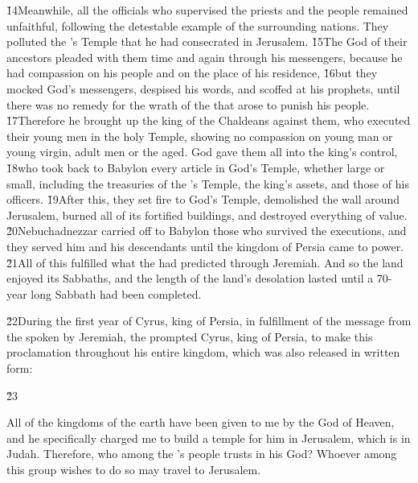 \v{14}Meanwhile, all the officials who supervised the priests and the people remained unfaithful, following the detestable example of the surrounding nations. They polluted the 's Temple that he had consecrated in Jerusalem. \v{15}The  God of their ancestors pleaded with them time and again through his messengers, because he had compassion on his people and on the place of his residence, \v{16}but they mocked God's messengers, despised his words, and scoffed at his prophets, until there was no remedy for the wrath of the  that arose to punish his people. \v{17}Therefore he brought up the king of the Chaldeans against them, who executed their young men in the holy Temple, showing no compassion on young man or young virgin, adult men or the aged. God gave them all into the king's control, \v{18}who took back to Babylon every article in God's Temple, whether large or small, including the treasuries of the 's Temple, the king's assets, and those of his officers. \v{19}After this, they set fire to God's Temple, demolished the wall around Jerusalem, burned all of its fortified buildings, and destroyed everything of value. \v{20}Nebuchadnezzar carried off to Babylon those who survived the executions, and they served him and his descendants until the kingdom of Persia came to power. \v{21}All of this fulfilled what the  had predicted through Jeremiah. And so the land enjoyed its Sabbaths, and the length of the land's desolation lasted until a 70-year long Sabbath had been completed.

\v{22}During the first year of Cyrus, king of Persia, in fulfillment of the message from the  spoken by Jeremiah, the  prompted Cyrus, king of Persia, to make this proclamation throughout his entire kingdom, which was also released in written form:

\v{23}  

\begin{poetry}
\poeml All of the kingdoms of the earth have been given to me by the  God of Heaven, and he specifically charged me to build a temple for him in Jerusalem, which is in Judah. Therefore, who among the 's people trusts in his God? Whoever among this group wishes to do so may travel to Jerusalem.
\end{poetry}
